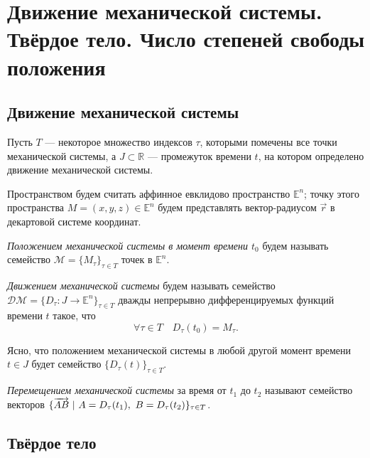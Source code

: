 \section{Движение механической системы. Твёрдое тело. Число степеней свободы
положения}

\subsection{Движение механической системы}

Пусть $T$ --- некоторое множество индексов $\tau$, которыми помечены все точки
механической системы, а $J \subset \mathbb{R}$ --- промежуток времени $t$, на
котором определено движение механической системы.

Пространством будем считать аффинное евклидово пространство $\mathbb{E}^n$;
точку этого пространства $M = (x,y,z) \in \mathbb{E}^n$ будем представлять
вектор-радиусом $\vec{r}$ в декартовой системе координат.

\begin{definition}
  \textit{Положением механической системы в момент времени $t_0$} будем называть
  семейство $\mathcal{M} = \{ M_\tau \}_{\tau \in T}$ точек в $\mathbb{E}^n$.
\end{definition}

\begin{definition}
  \textit{Движением механической системы} будем называть семейство
  $\mathcal{DM} = \{ D_\tau : J \to \mathbb{E}^n \}_{\tau \in T}$ дважды
  непрерывно дифференцируемых функций времени $t$ такое, что
  \begin{equation*}
    \forall \tau \in T \quad D_\tau(t_0) = M_\tau.
  \end{equation*}

  Ясно, что положением механической системы в любой другой момент времени
  $t \in J$ будет семейство $\{D_\tau(t)\}_{\tau \in T}$.
\end{definition}

\begin{definition}
  \textit{Перемещением механической системы} за время от $t_1$ до $t_2$ называют
  семейство векторов $\{ \overrightarrow{AB}~|~A = D_\tau(t_1),~ B = D_\tau(t_2) \}_{\tau 
  \in T}$.
\end{definition}

\subsection{Твёрдое тело}

